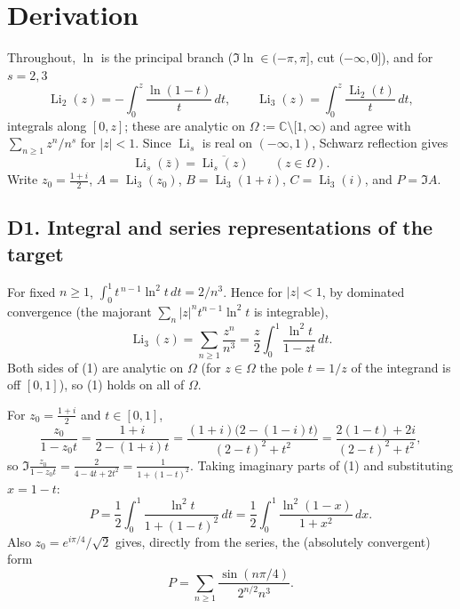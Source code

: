 \documentclass[11pt]{article}
\theoremstyle{remark}
\begin{document}
\section*{Derivation}

Throughout, $\ln$ is the principal branch ($\Im\ln\in(-\pi,\pi]$, cut $(-\infty,0]$), and for $s=2,3$
\[
\operatorname{Li}_2(z)=-\int_0^z\frac{\ln(1-t)}{t}\,dt,\qquad \operatorname{Li}_3(z)=\int_0^z\frac{\operatorname{Li}_2(t)}{t}\,dt ,
\]
integrals along $[0,z]$; these are analytic on $\Omega:=\mathbb{C}\setminus[1,\infty)$ and agree with $\sum_{n\ge1}z^n/n^s$ for $|z|<1$. Since $\operatorname{Li}_s$ is real on $(-\infty,1)$, Schwarz reflection gives
\begin{equation*}
\operatorname{Li}_s(\bar z)=\overline{\operatorname{Li}_s(z)}\qquad(z\in\Omega).\tag{0}
\end{equation*}
Write $z_0=\tfrac{1+i}2$, $A=\operatorname{Li}_3(z_0)$, $B=\operatorname{Li}_3(1+i)$, $C=\operatorname{Li}_3(i)$, and $P=\Im A$.

\subsection*{D1. Integral and series representations of the target}

For fixed $n\ge1$, $\int_0^1 t^{\,n-1}\ln^2t\,dt=2/n^3$. Hence for $|z|<1$, by dominated convergence (the majorant $\sum_n |z|^n t^{n-1}\ln^2 t$ is integrable),
\begin{equation*}
\operatorname{Li}_3(z)=\sum_{n\ge1}\frac{z^n}{n^3}=\frac z2\int_0^1\frac{\ln^2 t}{1-zt}\,dt. \tag{1}
\end{equation*}
Both sides of (1) are analytic on $\Omega$ (for $z\in\Omega$ the pole $t=1/z$ of the integrand is off $[0,1]$), so (1) holds on all of $\Omega$.

For $z_0=\tfrac{1+i}{2}$ and $t\in[0,1]$,
\[
\frac{z_0}{1-z_0t}=\frac{1+i}{2-(1+i)t}
=\frac{(1+i)\big(2-(1-i)t\big)}{(2-t)^2+t^2}
=\frac{2(1-t)+2i}{(2-t)^2+t^2},
\]
so $\displaystyle \Im\frac{z_0}{1-z_0t}=\frac{2}{4-4t+2t^2}=\frac{1}{1+(1-t)^2}$. Taking imaginary parts of (1) and substituting $x=1-t$:
\begin{equation*}
P=\frac12\int_0^1\frac{\ln^2 t}{1+(1-t)^2}\,dt=\frac12\int_0^1\frac{\ln^2(1-x)}{1+x^2}\,dx. \tag{2}
\end{equation*}
Also $z_0=e^{i\pi/4}/\sqrt2$ gives, directly from the series, the (absolutely convergent) form
\begin{equation*}
P=\sum_{n\ge1}\frac{\sin(n\pi/4)}{2^{n/2}n^3}. \tag{3}
\end{equation*}
\end{document}
